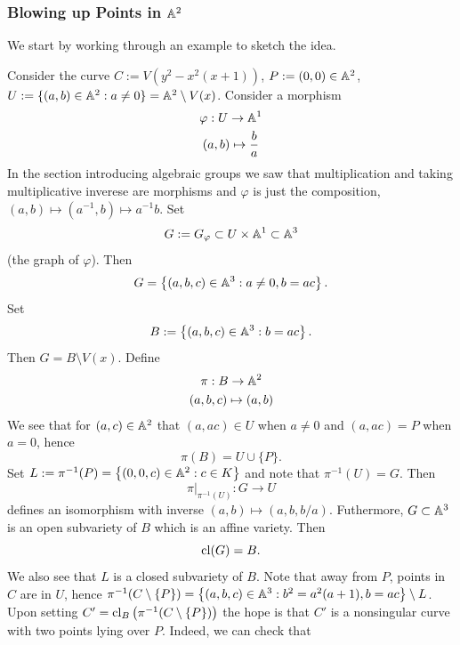     \subsubsection{Blowing up Points in $\mathbb{A}^2$}
        We start by working through an example to sketch the idea. 
        \begin{example}
            Consider the curve $C:=V(y^2-x^2(x+1))$, $P:=(0,0)\in \mathbb{A}^2$, $U:=\{(a,b)\in \mathbb{A}^2: a\neq 0\}=\mathbb{A}^2\setminus V(x)$. Consider a morphism 
            \begin{gather*}
                \varphi: U \rightarrow \mathbb{A}^1\\
                (a,b)\mapsto \frac{b}{a}
            \end{gather*}
            In the section introducing algebraic groups we saw that multiplication and taking multiplicative inverese are morphisms and $\varphi$ is just the composition, $(a,b)\mapsto (a^{-1},b)\mapsto a^{-1}b$. Set 
            $$
                G:=G_\varphi\subset U\times \mathbb{A}^1\subset \mathbb{A}^3
            $$ 
            (the graph of $\varphi$). Then 
            $$
                G=\left\{(a,b,c)\in \mathbb{A}^3 : a\neq 0,b=ac\right\}.
            $$ 
            Set 
            $$
                B:=\left\{ (a,b,c)\in \mathbb{A}^3 : b = ac \right\}.
            $$ 
            Then $G=B\setminus V(x)$. Define 
            \begin{gather*} 
                \pi : B \rightarrow \mathbb{A}^2\\
                (a,b,c)\mapsto (a,b)
            \end{gather*} 
            We see that for $(a,c)\in \mathbb{A}^2$ that $(a,ac)\in U$ when $a\neq 0$ and $(a,ac)=P$ when $a=0$, hence  
            $$
                \pi(B) = U\cup \{P\}.
            $$ 
            Set $L:= \pi^{-1}(P) = \left\{(0,0,c)\in \mathbb{A}^2: c\in K\right\}$ and note that $\pi^{-1}(U)=G$. Then 
            $$
                \left.\pi\right|_{\pi^{-1}(U)} : G\rightarrow U
            $$ 
            defines an isomorphism with inverse $(a,b)\mapsto (a,b,b/a)$. Futhermore, $G\subset \mathbb{A}^3$ is an open subvariety of $B$ which is an affine variety. Then 
            $$
                \mathrm{cl}(G)=B.
            $$ 
            We also see that $L$ is a closed subvariety of $B$. Note that away from $P$, points in $C$ are in $U$, hence $\pi^{-1}(C\setminus \{P\})=\left\{(a,b,c)\in \mathbb{A}^3 : b^2=a^2(a+1), b=ac\right\}\setminus L$. Upon setting $C' = \mathrm{cl}_B\left(\pi^{-1}(C\setminus \{P\})\right)$ the hope is that $C'$ is a nonsingular curve with two points lying over $P$. Indeed, we can check that 

\end{example}
